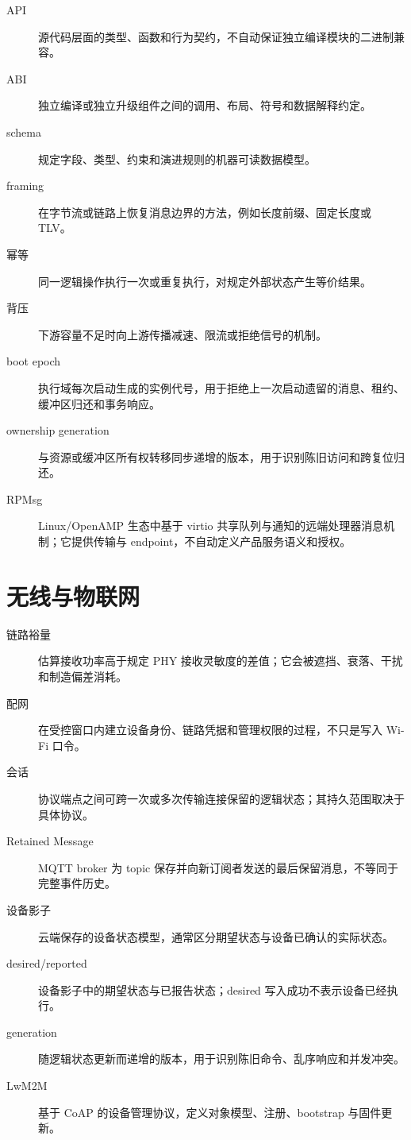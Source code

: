 \begin{description}
  \item[API] 源代码层面的类型、函数和行为契约，不自动保证独立编译模块的二进制兼容。
  \item[ABI] 独立编译或独立升级组件之间的调用、布局、符号和数据解释约定。
  \item[schema] 规定字段、类型、约束和演进规则的机器可读数据模型。
  \item[framing] 在字节流或链路上恢复消息边界的方法，例如长度前缀、固定长度或 TLV。
  \item[幂等] 同一逻辑操作执行一次或重复执行，对规定外部状态产生等价结果。
  \item[背压] 下游容量不足时向上游传播减速、限流或拒绝信号的机制。
  \item[boot epoch] 执行域每次启动生成的实例代号，用于拒绝上一次启动遗留的消息、租约、缓冲区归还和事务响应。
  \item[ownership generation] 与资源或缓冲区所有权转移同步递增的版本，用于识别陈旧访问和跨复位归还。
  \item[RPMsg] Linux/OpenAMP 生态中基于 virtio 共享队列与通知的远端处理器消息机制；它提供传输与 endpoint，不自动定义产品服务语义和授权。
\end{description}

\section{无线与物联网}

\begin{description}
  \item[链路裕量] 估算接收功率高于规定 PHY 接收灵敏度的差值；它会被遮挡、衰落、干扰和制造偏差消耗。
  \item[配网] 在受控窗口内建立设备身份、链路凭据和管理权限的过程，不只是写入 Wi-Fi 口令。
  \item[会话] 协议端点之间可跨一次或多次传输连接保留的逻辑状态；其持久范围取决于具体协议。
  \item[Retained Message] MQTT broker 为 topic 保存并向新订阅者发送的最后保留消息，不等同于完整事件历史。
  \item[设备影子] 云端保存的设备状态模型，通常区分期望状态与设备已确认的实际状态。
  \item[desired/reported] 设备影子中的期望状态与已报告状态；desired 写入成功不表示设备已经执行。
  \item[generation] 随逻辑状态更新而递增的版本，用于识别陈旧命令、乱序响应和并发冲突。
  \item[LwM2M] 基于 CoAP 的设备管理协议，定义对象模型、注册、bootstrap 与固件更新。
\end{description}

